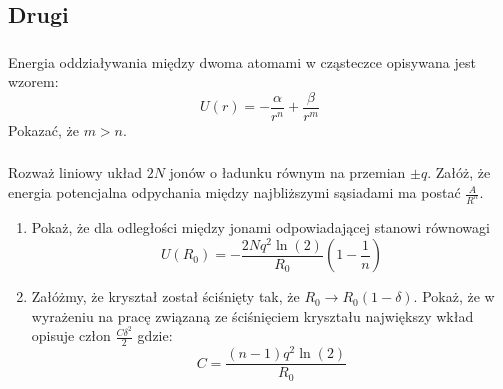 \subsection{Drugi}
\subsubsection{}
Energia oddziaływania między dwoma atomami w cząsteczce opisywana jest wzorem:
\[U(r) = -\frac{\alpha}{r^n}+\frac{\beta}{r^m}\]
Pokazać, że $m>n$.

\subsubsection{}
Rozważ liniowy układ $2N$ jonów o ładunku równym na przemian $\pm q$. Załóż, że energia potencjalna odpychania między najbliższymi sąsiadami ma postać $\frac{A}{R^n}$. 
\begin{enumerate}
\item Pokaż, że dla odległości między jonami odpowiadającej stanowi równowagi 
\[U(R_0) = -\frac{2Nq^2\ln(2)}{R_0}\left(1-\frac{1}{n}\right)\]
\item Załóżmy, że kryształ został ściśnięty tak, że $R_0\rightarrow R_0(1-\delta)$. Pokaż, że w wyrażeniu na pracę związaną ze ściśnięciem kryształu największy wkład opisuje człon $\frac{C\delta^2}{2}$ gdzie:
\[C=\frac{(n-1)q^2\ln(2)}{R_0}\]
\end{enumerate}

